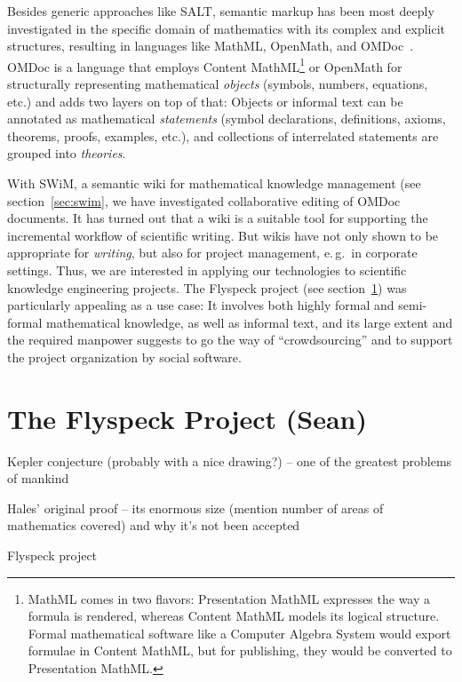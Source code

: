 \documentclass{llncs}
\begin{document}
Besides generic approaches like SALT, semantic markup has been most deeply
investigated in the specific domain of mathematics with its complex and explicit
structures, resulting in languages like MathML, OpenMath, and
OMDoc~\cite{Kohlhase:omdoc1.2}.  OMDoc is a language that employs Content
MathML\footnote{MathML comes in two flavors: Presentation MathML expresses the way a
formula is rendered, whereas Content MathML models its logical structure.  Formal
mathematical software like a Computer Algebra System would export formulae in Content
MathML, but for publishing, they would be converted to Presentation MathML.} or OpenMath
for structurally representing mathematical \emph{objects} (symbols, numbers, equations,
etc.) and adds two layers on top of that:  Objects or informal text can be annotated as
mathematical \emph{statements} (symbol declarations, definitions, axioms, theorems,
proofs, examples, etc.), and collections of interrelated statements are grouped into
\emph{theories}.

With SWiM, a semantic wiki for mathematical knowledge management (see
section~\ref{sec:swim}, we have investigated collaborative editing of OMDoc documents.  It
has turned out that a wiki is a suitable tool for supporting the incremental workflow of
scientific writing.  But wikis have not only shown to be appropriate for \emph{writing},
but also for project management, e.\,g.\ in corporate settings.
Thus, we are interested in applying our technologies to scientific knowledge engineering
projects.  The Flyspeck project (see section~\ref{sec:flyspeck}) was particularly
appealing as a use case:  It involves both highly formal and semi-formal mathematical
knowledge, as well as informal text, and its large extent and the required manpower
suggests to go the way of ``crowdsourcing'' and to support the project organization by
social software.

\section{The Flyspeck Project (Sean)}
\label{sec:flyspeck}

Kepler conjecture (probably with a nice drawing?) -- one of the greatest problems of
mankind

Hales' original proof -- its enormous size (mention number of areas of mathematics
covered) and why it's not been accepted

Flyspeck project\cite{hales:DSP:2006:432}
\end{document}
